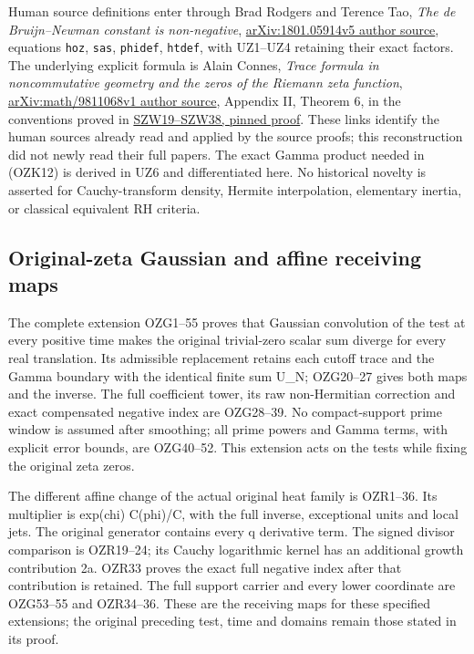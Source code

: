 \documentclass[
  10pt,
  a4paper,
]{article}
\begin{document}
Human source definitions enter through Brad Rodgers and Terence Tao,
\emph{The de Bruijn--Newman constant is non-negative},
\href{https://arxiv.org/src/1801.05914v5}{arXiv:1801.05914v5 author
source}, equations \texttt{hoz}, \texttt{sas}, \texttt{phidef},
\texttt{htdef}, with UZ1--UZ4 retaining their exact factors. The
underlying explicit formula is Alain Connes, \emph{Trace formula in
noncommutative geometry and the zeros of the Riemann zeta function},
\href{https://arxiv.org/src/math/9811068v1}{arXiv:math/9811068v1 author
source}, Appendix II, Theorem 6, in the conventions proved in
\href{https://github.com/KokunoYumeto/zeta-function-research-reader/blob/3c022a0adde0a6aa3d8fc8e43ef42795d88e44b0/workbenches/splitzero-tandem/branches/tau-zero-prime-positivity/SUPPORTED_ZERO_PRIME_WEIL_DERIVATION.md}{SZW19--SZW38,
pinned proof}. These links identify the human sources already read and
applied by the source proofs; this reconstruction did not newly read
their full papers. The exact Gamma product needed in (OZK12) is derived
in UZ6 and differentiated here. No historical novelty is asserted for
Cauchy-transform density, Hermite interpolation, elementary inertia, or
classical equivalent RH criteria.

\subsection{Original-zeta Gaussian and affine receiving
maps}\label{original-zeta-gaussian-and-affine-receiving-maps}

The complete extension OZG1--55 proves that Gaussian convolution of the
test at every positive time makes the original trivial-zero scalar sum
diverge for every real translation. Its admissible replacement retains
each cutoff trace and the Gamma boundary with the identical finite sum
U\_N; OZG20--27 gives both maps and the inverse. The full coefficient
tower, its raw non-Hermitian correction and exact compensated negative
index are OZG28--39. No compact-support prime window is assumed after
smoothing; all prime powers and Gamma terms, with explicit error bounds,
are OZG40--52. This extension acts on the tests while fixing the
original zeta zeros.

The different affine change of the actual original heat family is
OZR1--36. Its multiplier is exp(chi) C(phi)/C, with the full inverse,
exceptional units and local jets. The original generator contains every
q derivative term. The signed divisor comparison is OZR19--24; its
Cauchy logarithmic kernel has an additional growth contribution 2a.
OZR33 proves the exact full negative index after that contribution is
retained. The full support carrier and every lower coordinate are
OZG53--55 and OZR34--36. These are the receiving maps for these
specified extensions; the original preceding test, time and domains
remain those stated in its proof.
\end{document}
